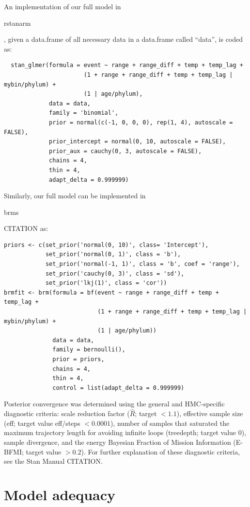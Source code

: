\documentclass[12pt,letterpaper]{article}
\begin{document}
An implementation of our full model in \begin{texttt}rstanarm\end{texttt}, given a data.frame of all necessary data in a data.frame called ``data'', is coded as:
\begin{verbatim}
  stan_glmer(formula = event ~ range + range_diff + temp + temp_lag + 
                       (1 + range + range_diff + temp + temp_lag | mybin/phylum) + 
                       (1 | age/phylum), 
             data = data, 
             family = 'binomial',
             prior = normal(c(-1, 0, 0, 0), rep(1, 4), autoscale = FALSE), 
             prior_intercept = normal(0, 10, autoscale = FALSE), 
             prior_aux = cauchy(0, 3, autoscale = FALSE), 
             chains = 4,
             thin = 4,
             adapt_delta = 0.999999)
\end{verbatim}

Similarly, our full model can be implemented in \begin{texttt}brms\end{texttt} CITATION as:
\begin{verbatim}
priors <- c(set_prior('normal(0, 10)', class= 'Intercept'),
            set_prior('normal(0, 1)', class = 'b'),
            set_prior('normal(-1, 1)', class = 'b', coef = 'range'),
            set_prior('cauchy(0, 3)', class = 'sd'),
            set_prior('lkj(1)', class = 'cor'))
brmfit <- brm(formula = bf(event ~ range + range_diff + temp + temp_lag +
                           (1 + range + range_diff + temp + temp_lag | mybin/phylum) +
                           (1 | age/phylum))
              data = data, 
              family = bernoulli(), 
              prior = priors,
              chains = 4, 
              thin = 4,
              control = list(adapt_delta = 0.999999)
\end{verbatim}

Posterior convergence was determined using the general and HMC-specific diagnostic criteria: scale reduction factor (\(\hat{R}\); target \(<1.1\)), effective sample size (eff; target value eff/steps \(<0.0001\)), number of samples that saturated the maximum trajectory length for avoiding infinite loops (treedepth; target value 0), sample divergence, and the energy Bayesian Fraction of Mission Information (E-BFMI; target value \(>0.2\)). For further explanation of these diagnostic criteria, see the Stan Manual CITATION.


\section{Model adequacy}
\end{document}
